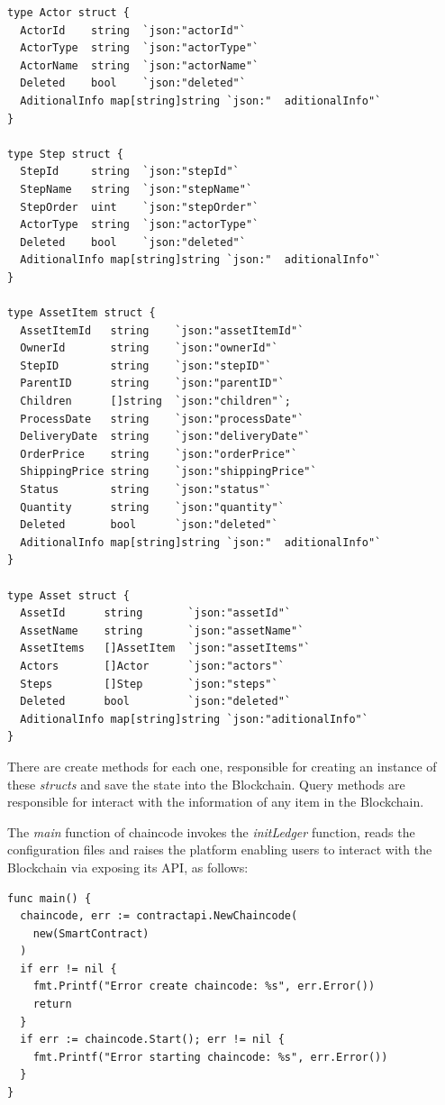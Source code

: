 \begin{lstlisting}
type Actor struct {
  ActorId    string  `json:"actorId"`
  ActorType  string  `json:"actorType"`
  ActorName  string  `json:"actorName"`
  Deleted    bool    `json:"deleted"`
  AditionalInfo map[string]string `json:"  aditionalInfo"`
}

type Step struct {
  StepId     string  `json:"stepId"`
  StepName   string  `json:"stepName"`
  StepOrder  uint    `json:"stepOrder"`
  ActorType  string  `json:"actorType"`
  Deleted    bool    `json:"deleted"`
  AditionalInfo map[string]string `json:"  aditionalInfo"`
}

type AssetItem struct {
  AssetItemId   string    `json:"assetItemId"`
  OwnerId       string    `json:"ownerId"`
  StepID        string    `json:"stepID"`
  ParentID      string    `json:"parentID"`
  Children      []string  `json:"children"`;
  ProcessDate   string    `json:"processDate"`
  DeliveryDate  string    `json:"deliveryDate"`
  OrderPrice    string    `json:"orderPrice"`
  ShippingPrice string    `json:"shippingPrice"`
  Status        string    `json:"status"`
  Quantity      string    `json:"quantity"`
  Deleted       bool      `json:"deleted"`
  AditionalInfo map[string]string `json:"  aditionalInfo"`
}

type Asset struct {
  AssetId      string       `json:"assetId"`
  AssetName    string       `json:"assetName"`
  AssetItems   []AssetItem  `json:"assetItems"`
  Actors       []Actor      `json:"actors"`
  Steps        []Step       `json:"steps"`
  Deleted      bool         `json:"deleted"`
  AditionalInfo map[string]string `json:"aditionalInfo"`
}
\end{lstlisting}

There are create methods for each one,  responsible for creating an instance of these \textit{structs} and save the state into the Blockchain. Query methods are responsible for interact with the information of any item in the Blockchain.


The \textit{main} function of chaincode invokes the \textit{initLedger} function, reads the configuration files and raises the platform enabling users to interact with the Blockchain via exposing its API, as follows: 

\begin{lstlisting}
func main() {
  chaincode, err := contractapi.NewChaincode(
    new(SmartContract)
  )
  if err != nil {
    fmt.Printf("Error create chaincode: %s", err.Error())
    return
  }
  if err := chaincode.Start(); err != nil {
    fmt.Printf("Error starting chaincode: %s", err.Error())
  }
}
\end{lstlisting}


